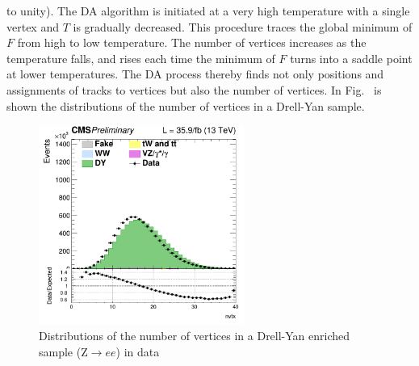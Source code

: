 to unity).
The DA algorithm is initiated at a very high temperature with a single vertex and $T$ is gradually decreased.
This procedure traces the global minimum of $F$ from high to low temperature.
The number of vertices increases as the temperature falls, and rises each time the minimum of $F$ turns into a saddle point at lower temperatures. 
The DA process thereby finds not only positions and assignments of tracks to vertices but also the number of vertices.
In Fig.~\label{Fig:pu} is shown the distributions of the number of vertices in a Drell-Yan sample.
\begin{figure}[htbp]
\centering
\includegraphics[width=0.6\textwidth]{../AN/Figs/nvertices.png}
\caption{
    Distributions of the number of vertices in a Drell-Yan enriched sample
    (Z$\rightarrow{}ee$) in
    data}
    \label{Fig:pu}
\end{figure}




